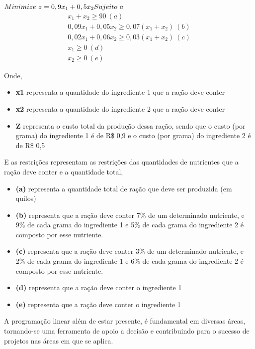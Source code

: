  $\\Minimize\ z=0,9x_{1}+0,5x_{2}\\
Sujeito\ a\\$
\begin{eqnarray*}
        x_{1}+x_{2}\geq 90 \ (a)\\
        0,09x_{1}+0,05x_{2}\geq 0,07(x_{1}+x_{2}) \ (b)\\
        0,02x_{1}+0,06x_{2}\geq 0,03(x_{1}+x_{2}) \ (c)\\
         x_{1}\geq 0 \ (d)\\
	 x_{2}\geq 0 \ (e)
\end{eqnarray*}

Onde, 
\begin{itemize}
\item \textbf {x1} representa a quantidade do ingrediente 1 que a ração deve conter
\item \textbf {x2} representa a quantidade do ingrediente 2 que a ração deve conter
\item \textbf {Z} representa o custo total da produção dessa ração, sendo que o custo (por grama) do ingrediente 1 é de R\$ 0,9 e o custo (por grama) do ingrediente 2 é de R\$ 0,5
\end{itemize}

E as restrições representam as restrições das quantidades de nutrientes que a ração deve conter e a quantidade total,
\begin{itemize}
\item \textbf {(a)} representa a quantidade total de ração que deve ser produzida (em quilos)
\item \textbf {(b)} representa que a ração deve conter 7\% de um determinado nutriente, e 9\% de cada grama do ingrediente 1 e 5\% de cada grama do ingrediente 2 é composto por esse nutriente. 
\item \textbf {(c)} representa que a ração deve conter 3\% de um determinado nutriente, e 2\% de cada grama do ingrediente 1 e 6\% de cada grama do ingrediente 2 é composto por esse nutriente.
\item \textbf {(d)} representa que a ração deve conter o ingrediente 1
\item \textbf {(e)} representa que a ração deve conter o ingrediente 1
\end{itemize}

A programação linear além de estar presente, é fundamental em diversas áreas, tornando-se uma ferramenta de apoio a decisão e contribuindo para o sucesso de projetos nas áreas em que se aplica.

